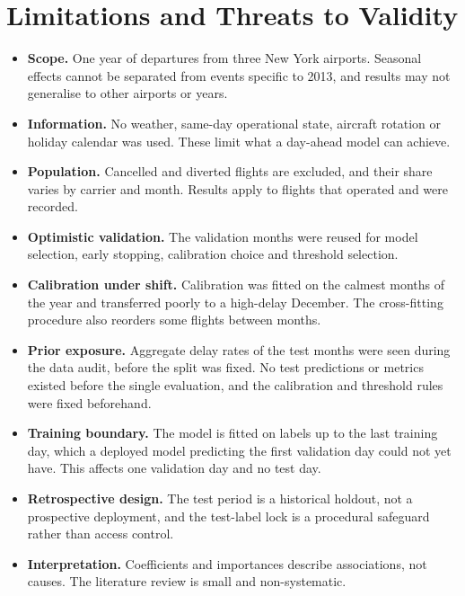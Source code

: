 \documentclass[conference]{IEEEtran}
\begin{document}
\section{Limitations and Threats to Validity}\label{sec:limitations}
\begin{itemize}
\item \textbf{Scope.} One year of departures from three New York airports. Seasonal effects cannot
be separated from events specific to 2013, and results may not generalise to other airports or years.
\item \textbf{Information.} No weather, same-day operational state, aircraft rotation or holiday
calendar was used. These limit what a day-ahead model can achieve.
\item \textbf{Population.} Cancelled and diverted flights are excluded, and their share varies by
carrier and month. Results apply to flights that operated and were recorded.
\item \textbf{Optimistic validation.} The validation months were reused for model selection, early
stopping, calibration choice and threshold selection.
\item \textbf{Calibration under shift.} Calibration was fitted on the calmest months of the year and
transferred poorly to a high-delay December. The cross-fitting procedure also reorders some flights
between months.
\item \textbf{Prior exposure.} Aggregate delay rates of the test months were seen during the data
audit, before the split was fixed. No test predictions or metrics existed before the single
evaluation, and the calibration and threshold rules were fixed beforehand.
\item \textbf{Training boundary.} The model is fitted on labels up to the last training day, which
a deployed model predicting the first validation day could not yet have. This affects one
validation day and no test day.
\item \textbf{Retrospective design.} The test period is a historical holdout, not a prospective
deployment, and the test-label lock is a procedural safeguard rather than access control.
\item \textbf{Interpretation.} Coefficients and importances describe associations, not causes. The
literature review is small and non-systematic.
\end{itemize}

\end{document}

